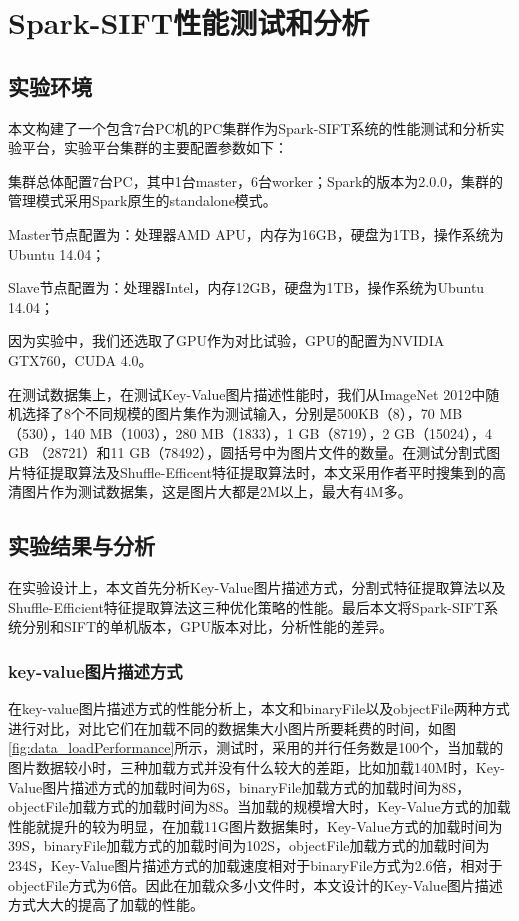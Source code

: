 ﻿\chapter{Spark-SIFT性能测试和分析}
\section{实验环境}
本文构建了一个包含7台PC机的PC集群作为Spark-SIFT系统的性能测试和分析实验平台，实验平台集群的主要配置参数如下：
\begin{compactenum}
\item 集群总体配置7台PC，其中1台master，6台worker；Spark的版本为2.0.0，集群的管理模式采用Spark原生的standalone模式。
\item Master节点配置为：处理器AMD APU，内存为16GB，硬盘为1TB，操作系统为Ubuntu 14.04；
\item Slave节点配置为：处理器Intel，内存12GB，硬盘为1TB，操作系统为Ubuntu 14.04；
\end{compactenum}

因为实验中，我们还选取了GPU作为对比试验，GPU的配置为NVIDIA GTX760，CUDA 4.0。

在测试数据集上，在测试Key-Value图片描述性能时，我们从ImageNet 2012中随机选择了8个不同规模的图片集作为测试输入，分别是500KB（8），70 MB（530），140 MB（1003），280 MB（1833），1 GB（8719），2 GB（15024），4 GB （28721）和11 GB（78492），圆括号中为图片文件的数量。在测试分割式图片特征提取算法及Shuffle-Efficent特征提取算法时，本文采用作者平时搜集到的高清图片作为测试数据集，这是图片大都是2M以上，最大有4M多。
\section{实验结果与分析}
在实验设计上，本文首先分析Key-Value图片描述方式，分割式特征提取算法以及Shuffle-Efficient特征提取算法这三种优化策略的性能。最后本文将Spark-SIFT系统分别和SIFT的单机版本，GPU版本对比，分析性能的差异。
\subsection{key-value图片描述方式}
在key-value图片描述方式的性能分析上，本文和binaryFile以及objectFile两种方式进行对比，对比它们在加载不同的数据集大小图片所要耗费的时间，如图\ref{fig:data_loadPerformance}所示，测试时，采用的并行任务数是100个，当加载的图片数据较小时，三种加载方式并没有什么较大的差距，比如加载140M时，Key-Value图片描述方式的加载时间为6S，binaryFile加载方式的加载时间为8S，objectFile加载方式的加载时间为8S。当加载的规模增大时，Key-Value方式的加载性能就提升的较为明显，在加载11G图片数据集时，Key-Value方式的加载时间为39S，binaryFile加载方式的加载时间为102S，objectFile加载方式的加载时间为234S，Key-Value图片描述方式的加载速度相对于binaryFile方式为2.6倍，相对于objectFile方式为6倍。因此在加载众多小文件时，本文设计的Key-Value图片描述方式大大的提高了加载的性能。

